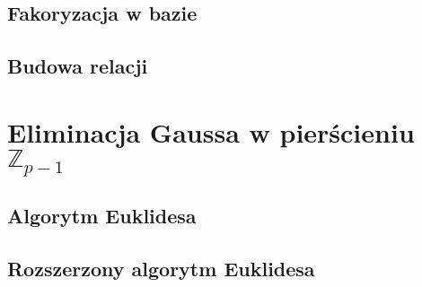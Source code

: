 \documentclass[]{article}
\begin{document}
	\subsection{Fakoryzacja w bazie}
	
	\subsection{Budowa relacji}

\section{Eliminacja Gaussa w pierścieniu \(\mathbb{Z}_{p-1}\)}
	\subsection{Algorytm Euklidesa}

	\subsection{Rozszerzony algorytm Euklidesa}
	
\end{document}
